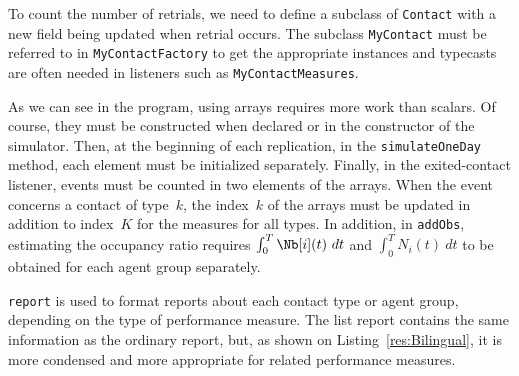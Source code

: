 To count the number of retrials, we need to define a subclass of
\texttt{Contact} with a new field being updated when retrial
occurs.  The subclass \texttt{My\-Contact} must be
referred to in \texttt{My\-Contact\-Factory} to get the appropriate
instances and typecasts are often needed in listeners such as
\texttt{My\-Contact\-Measures}.


As we can see in the program,
using arrays requires more work than scalars.
Of course, they must be constructed when declared or in the constructor of
the simulator.
Then, at the beginning of each replication, in the
\texttt{simulate\-One\-Day} method, each element must be initialized
separately.  Finally, in the exited-contact listener, events must be
counted in
two elements of the arrays.  When the event concerns a contact of
type~$k$, the index~$k$ of the arrays must be updated in addition to
index~$K$ for the measures for all types.
In addition, in \texttt{add\-Obs}, estimating the occupancy ratio
requires
$\int_0^T \Nb[i](t)\ dt$ and
$\int_0^T N_i(t)\ dt$ to be obtained for each agent group separately.

\texttt{report} is used to format
reports about each contact type or agent group, depending on the type
of performance measure.  The list report contains the
same information as the ordinary report, but, as shown on
Listing~\ref{res:Bilingual}, it is more condensed and
more appropriate for related performance measures.


